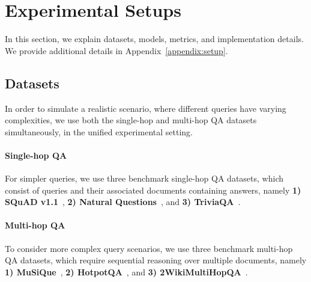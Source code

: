 \section{Experimental Setups}
In this section, we explain datasets, models, metrics, and implementation details. We provide additional details in Appendix~\ref{appendix:setup}.


\subsection{Datasets}
In order to simulate a realistic scenario, where different queries have varying complexities, we use both the single-hop and multi-hop QA datasets simultaneously, in the unified experimental setting.



\paragraph{Single-hop QA}
For simpler queries, we use three benchmark single-hop QA datasets, which consist of queries and their associated documents containing answers, namely \textbf{1) SQuAD v1.1}~\cite{squad}, \textbf{2) Natural Questions}~\cite{nq}, and \textbf{3) TriviaQA}~\cite{tqa}.

\paragraph{Multi-hop QA}
To consider more complex query scenarios, we use three benchmark multi-hop QA datasets, which require sequential reasoning over multiple documents, namely \textbf{1) MuSiQue}~\cite{musique}, \textbf{2) HotpotQA}~\cite{hotpotqa}, and \textbf{3) 2WikiMultiHopQA}~\cite{2hop}.







